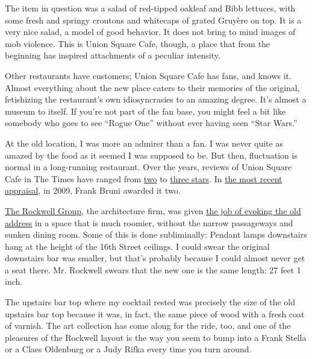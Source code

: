 The item in question was a salad of red-tipped oakleaf and Bibb
lettuces, with some fresh and springy croutons and whitecaps of grated
Gruyère on top. It is a very nice salad, a model of good behavior. It
does not bring to mind images of mob violence. This is Union Square
Cafe, though, a place that from the beginning has inspired attachments
of a peculiar intensity.

Other restaurants have customers; Union Square Cafe has fans, and knows
it. Almost everything about the new place caters to their memories of
the original, fetishizing the restaurant's own idiosyncrasies to an
amazing degree. It's almost a museum to itself. If you're not part of
the fan base, you might feel a bit like somebody who goes to see ``Rogue
One'' without ever having seen ``Star Wars.''

At the old location, I was more an admirer than a fan. I was never quite
as amazed by the food as it seemed I was supposed to be. But then,
fluctuation is normal in a long-running restaurant. Over the years,
reviews of Union Square Cafe in The Times have ranged from
\href{http://www.nytimes3xbfgragh.onion/1986/01/24/arts/restaurants-693586.html}{two}
to
\href{http://www.nytimes3xbfgragh.onion/1999/09/01/dining/restaurants-even-the-doggy-bags-really-care.html}{three
stars}. In
\href{http://www.nytimes3xbfgragh.onion/2009/08/05/dining/reviews/05rest.html}{the
most recent appraisal}, in 2009, Frank Bruni awarded it two.

\href{http://www.rockwellgroup.com/}{The Rockwell Group}, the
architecture firm, was given
\href{https://www.nytimes3xbfgragh.onion/2016/09/07/dining/union-square-cafe-restaurant-design-danny-meyer-david-rockwell.html}{the
job of evoking the old address} in a space that is much roomier, without
the narrow passageways and sunken dining room. Some of this is done
subliminally: Pendant lamps downstairs hang at the height of the 16th
Street ceilings. I could swear the original downstairs bar was smaller,
but that's probably because I could almost never get a seat there. Mr.
Rockwell swears that the new one is the same length: 27 feet 1 inch.

The upstairs bar top where my cocktail rested was precisely the size of
the old upstairs bar top because it was, in fact, the same piece of wood
with a fresh coat of varnish. The art collection has come along for the
ride, too, and one of the pleasures of the Rockwell layout is the way
you seem to bump into a Frank Stella or a Claes Oldenburg or a Judy
Rifka every time you turn around.

